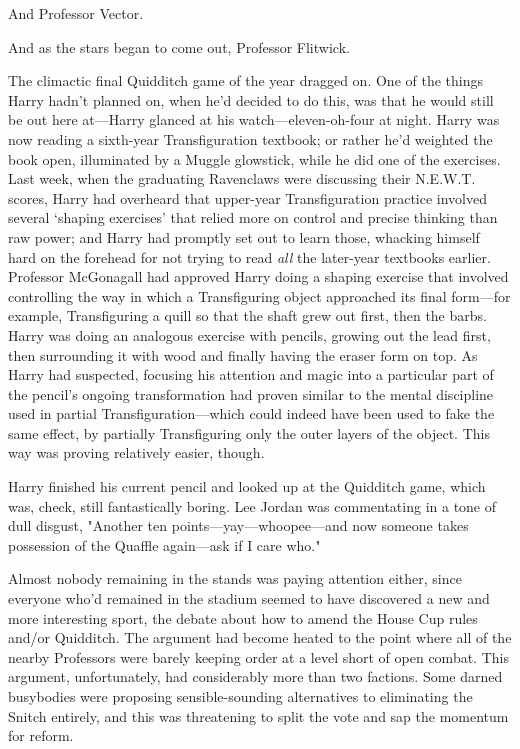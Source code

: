 And Professor Vector.

And as the stars began to come out, Professor Flitwick.

The climactic final Quidditch game of the year{\el} dragged on.
\sbreak
One of the things Harry hadn't planned on, when he'd decided to do this, was
that he would still be out here at---Harry glanced at his
watch---eleven-oh-four at night. Harry was now reading a sixth-year
Transfiguration textbook; or rather he'd weighted the book open, illuminated by
a Muggle glowstick, while he did one of the exercises. Last week, when the
graduating Ravenclaws were discussing their N.E.W.T. scores, Harry had
overheard that upper-year Transfiguration practice involved several `shaping
exercises' that relied more on control and precise thinking than raw power; and
Harry had promptly set out to learn those, whacking himself hard on the
forehead for not trying to read \emph{all} the later-year textbooks earlier.
Professor McGonagall had approved Harry doing a shaping exercise that involved
controlling the way in which a Transfiguring object approached its final
form---for example, Transfiguring a quill so that the shaft grew out first,
then the barbs. Harry was doing an analogous exercise with pencils, growing out
the lead first, then surrounding it with wood and finally having the eraser
form on top. As Harry had suspected, focusing his attention and magic into a
particular part of the pencil's ongoing transformation had proven similar to
the mental discipline used in partial Transfiguration---which could indeed have
been used to fake the same effect, by partially Transfiguring only the outer
layers of the object. This way was proving relatively easier, though.

Harry finished his current pencil and looked up at the Quidditch game, which
was, check, still fantastically boring. Lee Jordan was commentating in a tone
of dull disgust, "Another ten points---yay---whoopee---and now someone takes
possession of the Quaffle again---ask if I care who."

Almost nobody remaining in the stands was paying attention either, since
everyone who'd remained in the stadium seemed to have discovered a new and more
interesting sport, the debate about how to amend the House Cup rules and/or
Quidditch. The argument had become heated to the point where all of the nearby
Professors were barely keeping order at a level short of open combat. This
argument, unfortunately, had considerably more than two factions. Some darned
busybodies were proposing sensible-sounding alternatives to eliminating the
Snitch entirely, and this was threatening to split the vote and sap the
momentum for reform.

